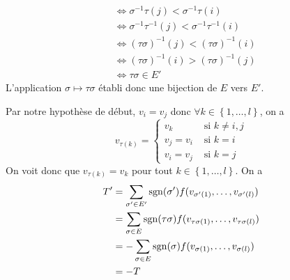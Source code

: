 \begin{theoreme}
\begin{preuve}
\begin{align*}
                    &\iff \sigma^{-1}\tau(j) < \sigma^{-1}\tau(i) \\
                    &\iff \sigma^{-1}\tau^{-1}(j) < \sigma^{-1}\tau^{-1}(i) \\
                    &\iff (\tau\sigma)^{-1}(j) < (\tau\sigma)^{-1}(i) \\
                    &\iff (\tau\sigma)^{-1}(i) > (\tau\sigma)^{-1}(j) \\
                    &\iff \tau\sigma \in E'
    \end{align*}
    L'application $\sigma \mapsto \tau\sigma$ établi donc une bijection de $E$ vers $E'$.
    \par Par notre hypothèse de début, $v_i = v_j$ donc  $\forall k \in \left\{ 1, \dots, l \right\}$, on a
    $$v_{\tau(k)} = \begin{cases}
      v_k & \text{ si } k \not = i, j \\
      v_j = v_i & \text{ si } k = i \\
      v_i = v_j & \text{ si } k=j
    \end{cases}$$
    On voit donc que $v_{\tau(k)} = v_k$ pour tout  $k \in \left\{ 1, \dots, l \right\}$. On a
    \begin{align*}
      T' &= \sum_{\sigma' \in E'} \operatorname{sgn}(\sigma')f(v_{\sigma'(1)}, \dots, v_{\sigma'(l)}) \\
         &= \sum_{\sigma \in E} \operatorname{sgn}(\tau\sigma)f(v_{\tau\sigma(1)}, \dots, v_{\tau\sigma(l)}) \\
         &= -\sum_{\sigma \in E} \operatorname{sgn}(\sigma)f(v_{\sigma(1)}, \dots, v_{\sigma(l)})  \\
         &= -T
    \end{align*}
  \end{preuve}
\end{theoreme}

